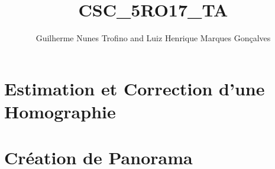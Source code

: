 \documentclass{article}
\title{CSC\_5RO17\_TA}
\author{Guilherme Nunes Trofino and Luiz Henrique Marques Gonçalves}
\begin{document}
\maketitle

\newpage\tableofcontents

\section{Estimation et Correction d'une Homographie}




\section{Création de Panorama}

\end{document}
